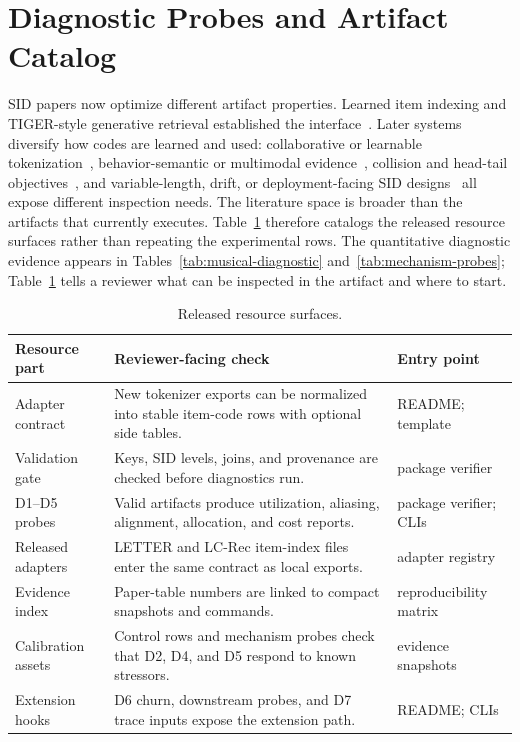 \section{Diagnostic Probes and Artifact Catalog}

SID papers now optimize different artifact properties. Learned item indexing
and TIGER-style generative retrieval established the interface~\cite{hua2023indexids,rajput2023tiger}.
Later systems diversify how codes are learned and used: collaborative or
learnable tokenization~\cite{zheng2023lcrec,wang2024letter,liu2024elit},
behavior-semantic or multimodal evidence~\cite{wang2024eager,chen2026syngr},
collision and head-tail objectives~\cite{hu2026quasid,pan2026adasid,yan2026aktrec},
and variable-length, drift, or deployment-facing SID designs~\cite{cheng2026capsid,baikalov2026staleness,ju2026snapchatsid}
all expose different inspection needs.
The literature space is broader than the artifacts that \tool currently
executes. Table~\ref{tab:method-coverage} therefore catalogs the released
resource surfaces rather than repeating the experimental rows. The quantitative
diagnostic evidence appears in Tables~\ref{tab:musical-diagnostic}
and~\ref{tab:mechanism-probes}; Table~\ref{tab:method-coverage} tells a
reviewer what can be inspected in the artifact and where to start.

\begin{table}[t]
\caption{Released resource surfaces.}
\label{tab:method-coverage}
\scriptsize
\setlength{\tabcolsep}{2pt}
\begin{tabularx}{\columnwidth}{@{}>{\raggedright\arraybackslash}p{}>{\raggedright\arraybackslash}X>{\raggedright\arraybackslash}p{}@{}}
\toprule
Resource part & Reviewer-facing check & Entry point \\
\midrule
Adapter contract & New tokenizer exports can be normalized into stable
item-code rows with optional side tables. & README; template \\
Validation gate & Keys, SID levels, joins, and provenance are checked before
diagnostics run. & package verifier \\
D1--D5 probes & Valid artifacts produce utilization, aliasing, alignment,
allocation, and cost reports. & package verifier; CLIs \\
Released adapters & LETTER and LC-Rec item-index files enter the same
contract as local exports. & adapter registry \\
Evidence index & Paper-table numbers are linked to compact snapshots and
commands. &
reproducibility matrix \\
Calibration assets & Control rows and mechanism probes check that D2, D4, and
D5 respond to known stressors. &
evidence snapshots \\
Extension hooks & D6 churn, downstream probes, and D7 trace inputs expose the
extension path. & README; CLIs \\
\bottomrule
\end{tabularx}
\end{table}

